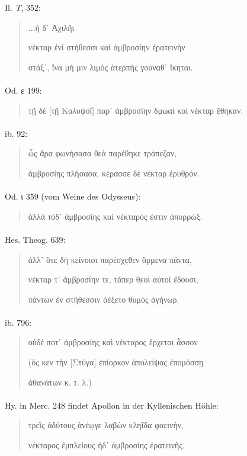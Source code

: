 \documentclass[a4paper, 11pt, oneside]{article}
\begin{document}
Il. \emph{T}, 352:
\begin{quotation}\large
...ἡ δ᾽ Ἀχιλῆι

νέκταρ ἐνὶ στήθεσσι καὶ ἀμβροσίην ἐρατεινὴν

στάξ᾽, ἵνα μή μιν λιμὸς ἀτερπὴς γούναθ᾽ ἴκηται.
\end{quotation}
\paragraph{}
Od. ε 199:
\begin{quotation}\large
τῇ δὲ [τῇ Καλυψοῖ] παρ᾽ ἀμβροσίην δμωαὶ καὶ νέκταρ ἔθηκαν.
\end{quotation}
\paragraph{}
ib. 92:
\begin{quotation}\large
ὧς ἄρα φωνήσασα θεὰ παρέθηκε τράπεζαν,

ἀμβροσίης πλήσασα, κέρασσε δὲ νέκταρ ἐρυθρόν.
\end{quotation}
\paragraph{}
Od. ι 359 (vom Weine des Odysseus):
\begin{quotation}\large
ἀλλὰ τόδ᾽ ἀμβροσίης καὶ νέκταρός ἐστιν ἀπορρώξ.
\end{quotation}
\paragraph{}
Hes. Theog. 639:
\begin{quotation}\large
ἀλλ᾽ ὅτε δὴ κείνοισι παρέσχεθεν ἄρμενα πάντα,

νέκταρ τ᾽ ἀμβροσίην τε, τάπερ θεοὶ αὐτοὶ ἔδουσι,

πάντων ἐν στήθεσσιν ἀέξετο θυμὸς ἀγήνωρ.
\end{quotation}
\paragraph{}
ib. 796:
\begin{quotation}\large
οὐδέ ποτ᾽ ἀμβροσίης καὶ νέκταρος ἔρχεται ἆσσον

(ὅς κεν τὴν [Στύγα] ἐπίορκον ἀπολείψας ἐπομόσσῃ

ἀθανάτων κ. τ. λ.)
\end{quotation}
\paragraph{}
Hy. in Merc. 248 findet Apollon in der Kyllenischen Höhle:
\begin{quotation}\large
τρεῖς ἀδύτους ἀνέῳγε λαβὼν κληῖδα φαεινήν,

νέκταρος ἐμπλείους ἠδ᾽ ἀμβροσίης ἐρατεινῆς.
\end{quotation}
\end{document}
